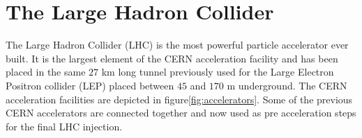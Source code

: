 

\section{The Large Hadron Collider}
The Large Hadron Collider (LHC) is the most powerful particle accelerator ever built.
It is the largest element of the CERN acceleration facility and has been placed in the same $27$ km long tunnel previously used for the Large Electron Positron collider (LEP) placed between $45$ and $170$ m underground.
The CERN acceleration facilities are depicted in figure\ref{fig:accelerators}.
Some of the previous CERN accelerators are connected together and now used as pre acceleration steps for the final LHC injection.

